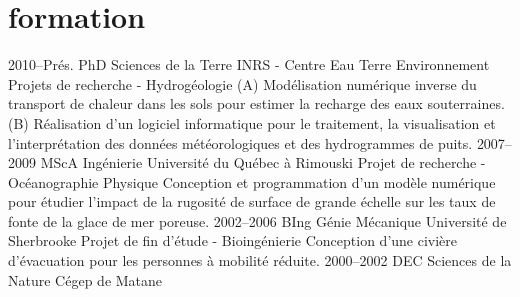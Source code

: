 \documentclass[]{friggeri-cv} %
\begin{document}
\section{formation}
%
\begin{entrylist}
\entryMod
{2010--Prés.}
{PhD {\normalfont Sciences de la Terre}}
{INRS - Centre Eau Terre Environnement}
{Projets de recherche - Hydrogéologie}
{(A) Modélisation numérique inverse du transport de chaleur dans les sols pour estimer la recharge des eaux souterraines. (B) Réalisation d'un logiciel informatique pour le traitement, la visualisation et l'interprétation des données météorologiques et des hydrogrammes de puits.}
\entryMod
{2007--2009}
{MScA {\normalfont Ingénierie}}
{Université du Québec à Rimouski}
{Projet de recherche - Océanographie Physique}
{Conception et programmation d'un modèle numérique pour étudier l'impact de la rugosité de surface de grande échelle sur les taux de fonte de la glace de mer poreuse.}
\entryMod
{2002--2006}
{BIng {\normalfont Génie Mécanique}}
{Université de Sherbrooke}
{Projet de fin d'étude - Bioingénierie}
{Conception d'une civière d'évacuation pour les personnes à mobilité réduite.}
\entryAlt
{2000--2002}
{DEC {\normalfont Sciences de la Nature}}
{Cégep de Matane}
\end{entrylist}
%
%
\end{document}
